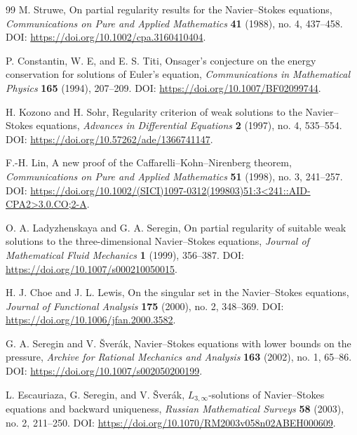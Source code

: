 \documentclass[11pt]{article}
\numberwithin{equation}{section}
\theoremstyle{plain}
\theoremstyle{definition}
\theoremstyle{remark}
\begin{document}
\begin{thebibliography}{99}
	M. Struwe,
	On partial regularity results for the Navier--Stokes equations,
	\newblock \emph{Communications on Pure and Applied Mathematics} \textbf{41} (1988), no. 4, 437--458.
	\newblock DOI: \url{https://doi.org/10.1002/cpa.3160410404}.

	P. Constantin, W. E, and E. S. Titi,
	Onsager's conjecture on the energy conservation for solutions of Euler's equation,
	\newblock \emph{Communications in Mathematical Physics} \textbf{165} (1994), 207--209.
	\newblock DOI: \url{https://doi.org/10.1007/BF02099744}.

	H. Kozono and H. Sohr,
	Regularity criterion of weak solutions to the Navier--Stokes equations,
	\newblock \emph{Advances in Differential Equations} \textbf{2} (1997), no. 4, 535--554.
	\newblock DOI: \url{https://doi.org/10.57262/ade/1366741147}.

	F.-H. Lin,
	A new proof of the Caffarelli--Kohn--Nirenberg theorem,
	\newblock \emph{Communications on Pure and Applied Mathematics} \textbf{51} (1998), no. 3, 241--257.
	\newblock DOI: \url{https://doi.org/10.1002/(SICI)1097-0312(199803)51:3<241::AID-CPA2>3.0.CO;2-A}.

	O. A. Ladyzhenskaya and G. A. Seregin,
	On partial regularity of suitable weak solutions to the three-dimensional Navier--Stokes equations,
	\newblock \emph{Journal of Mathematical Fluid Mechanics} \textbf{1} (1999), 356--387.
	\newblock DOI: \url{https://doi.org/10.1007/s000210050015}.

	H. J. Choe and J. L. Lewis,
	On the singular set in the Navier--Stokes equations,
	\newblock \emph{Journal of Functional Analysis} \textbf{175} (2000), no. 2, 348--369.
	\newblock DOI: \url{https://doi.org/10.1006/jfan.2000.3582}.

	G. A. Seregin and V. \v{S}ver\'ak,
	Navier--Stokes equations with lower bounds on the pressure,
	\newblock \emph{Archive for Rational Mechanics and Analysis} \textbf{163} (2002), no. 1, 65--86.
	\newblock DOI: \url{https://doi.org/10.1007/s002050200199}.

	L. Escauriaza, G. Seregin, and V. \v{S}ver\'ak,
	\(L_{3,\infty}\)-solutions of Navier--Stokes equations and backward uniqueness,
	\newblock \emph{Russian Mathematical Surveys} \textbf{58} (2003), no. 2, 211--250.
	\newblock DOI: \url{https://doi.org/10.1070/RM2003v058n02ABEH000609}.


\end{thebibliography}
\end{document}
